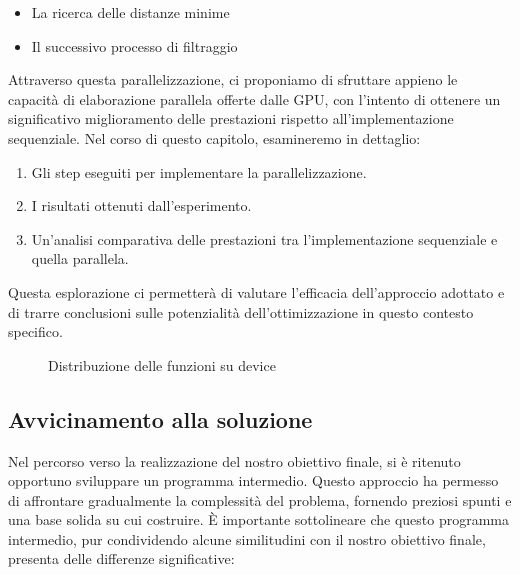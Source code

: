 \documentclass[12pt,a4paper]{report}
\begin{document}
\begin{itemize}
    \item La ricerca delle distanze minime
    \item Il successivo processo di filtraggio
\end{itemize}

Attraverso questa parallelizzazione, ci proponiamo di sfruttare appieno le capacità di elaborazione parallela offerte dalle GPU, con l'intento di ottenere un significativo miglioramento delle prestazioni rispetto all'implementazione sequenziale.
Nel corso di questo capitolo, esamineremo in dettaglio:

\begin{enumerate}
    \item Gli step eseguiti per implementare la parallelizzazione.
    \item I risultati ottenuti dall'esperimento.
    \item Un'analisi comparativa delle prestazioni tra l'implementazione sequenziale e quella parallela.
\end{enumerate}

Questa esplorazione ci permetterà di valutare l'efficacia dell'approccio adottato e di trarre conclusioni sulle potenzialità dell'ottimizzazione in questo contesto specifico.

\begin{figure}[h]
    \centering
    \caption{Distribuzione delle funzioni su device}
\end{figure}

\subsection{Avvicinamento alla soluzione}

Nel percorso verso la realizzazione del nostro obiettivo finale, si è ritenuto opportuno sviluppare un programma intermedio. Questo approccio ha permesso di affrontare gradualmente la complessità del problema, fornendo preziosi spunti e una base solida su cui costruire.
È importante sottolineare che questo programma intermedio, pur condividendo alcune similitudini con il nostro obiettivo finale, presenta delle differenze significative:
\end{document}
